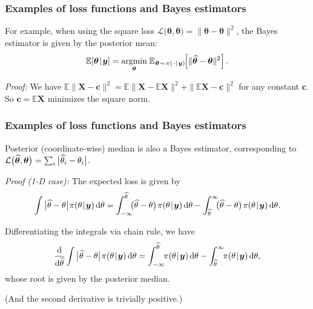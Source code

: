\documentclass[18pt]{beamer}
\newcommand{\defineTightSpacing}{%
	\setlength{\abovedisplayskip}{.25\baselineskip}%
	\setlength{\belowdisplayskip}{.25\baselineskip}%
}
\renewcommand{\textsc}[1]{{\small \MakeUppercase{#1}}}
\newcommand{\given}{\thinnerspace | \thinnerspace}
\newcommand{\diff}{\operatorname{\mathrm{d}}\!{}}
\DeclareMathOperator*{\argmin}{argmin}
\newcommand{\thinnerspace}{\mskip.5\thinmuskip}
\newcommand{\thinnestspace}{\mskip.25\thinmuskip}
\newcommand{\expectation}{\mathbb{E}}
\newcommand{\density}{\pi}
\newcommand{\by}{\bm{y}}
\newcommand{\btheta}{\bm{\theta}}
\newcommand{\loss}{\mathcal{L}}
\begin{document}
\begin{frame}
\frametitle{Examples of loss functions and Bayes estimators}
\smallskip
For example, when using the square loss $\loss\big(\widehat{\btheta}, \btheta \big) = \| \widehat{\btheta} - \btheta\|^2$, the Bayes estimator is given by the posterior mean:
\begin{equation*} \defineTightSpacing%
\expectation\!\left[ \btheta \given \by \right] =
	\argmin_{\btheta} \thinnerspace \expectation_{\thinnerspace \btheta \thinnerspace \sim \thinnerspace \density(\thinnerspace \cdot \given \by)\!}\!\left[
		 \| \widehat{\btheta} - \btheta\|^2
	\right].
\end{equation*}

\pause
\textit{Proof:} We have $\expectation \| \mathbf{X} - \mathbf{c} \|^2 = \expectation \| \mathbf{X} - \expectation \mathbf{X} \|^2 + \| \expectation \mathbf{X} - \mathbf{c} \|^2$ for any constant $\mathbf{c}$. 
So $\mathbf{c} = \expectation \mathbf{X}$ minimizes the square norm. \hfill \qedsymbol
\end{frame}


\begin{frame}
\frametitle{Examples of loss functions and Bayes estimators}
Posterior (coordinate-wise) median is also a Bayes estimator, corresponding to $\loss\big(\widehat{\btheta}, \btheta \big) = \sum_i \big| \thinnestspace \widehat{\theta}_i - \theta_i \big|$.

\pause
\smallskip
\textit{Proof (1-\textsc{D} case):} 
The expected loss is given by
\begin{equation*} \defineTightSpacing%
\int \big| \thinnestspace \widehat{\theta} - \theta \big| \thinnerspace \density(\theta \given \by) \diff \theta
	= \int_{-\infty}^{\widehat{\theta}} \!\!\! \big( \widehat{\theta} - \theta \big) \thinnerspace \density(\theta \given \by) \diff \theta
		- \int_{\widehat{\theta}}^\infty \!\!\! \big( \widehat{\theta} - \theta \big) \thinnerspace \density(\theta \given \by) \diff \theta.
\end{equation*}

\pause
Differentiating the integrals via chain rule, we have
\begin{equation*} \defineTightSpacing%
\frac{\diff}{\diff \widehat{\theta}} \int \big| \thinnestspace \widehat{\theta} - \theta \big| \thinnerspace \density(\theta \given \by) \diff \theta
	= \int_{-\infty}^{\widehat{\theta}} \!\! \density(\theta \given \by) \diff \theta
		- \int_{\widehat{\theta}}^\infty \!\! \density(\theta \given \by) \diff \theta,
\end{equation*}
whose root is given by the posterior median.

\pause
(And the second derivative is trivially positive.) \hfill \qedsymbol
\end{frame}
\end{document}
